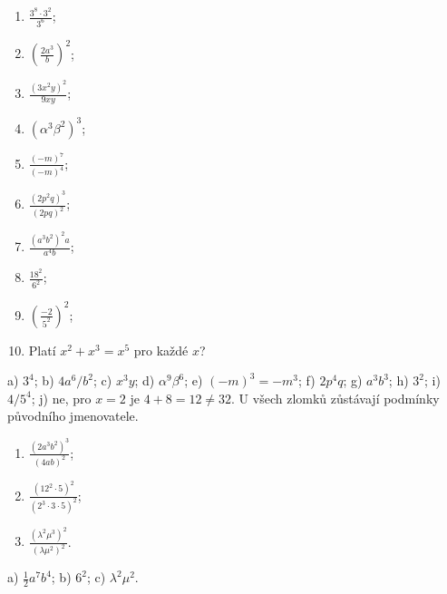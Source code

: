 \documentclass[11pt,a4paper]{article}
\begin{document}
\begin{zadaniReseniBox}[title={Domácí úkol}]
\begin{enumerate}[label=\alph*)]
\item $\frac{3^8\cdot3^2}{3^6}$;
\item $\left(\frac{2a^3}{b}\right)^2$;
\item $\frac{(3x^2y)^2}{9xy}$;
\item $(\alpha^3\beta^2)^3$;
\item $\frac{(-m)^7}{(-m)^4}$;
\item $\frac{(2p^2q)^3}{(2pq)^2}$;
\item $\frac{(a^3b^2)^2a}{a^4b}$;
\item $\frac{18^2}{6^2}$;
\item $\left(\frac{-2}{5^2}\right)^2$;
\item Platí $x^2+x^3=x^5$ pro každé $x$?
\end{enumerate}
\tcblower
 a) $3^4$; b) $4a^6/b^2$; c) $x^3y$;
 d) $\alpha^9\beta^6$; e) $(-m)^3=-m^3$;
 f) $2p^4q$; g) $a^3b^3$; h) $3^2$; i) $4/5^4$;
 j) ne, pro $x=2$ je $4+8=12\ne32$.
U všech zlomků zůstávají podmínky původního jmenovatele.
\end{zadaniReseniBox}
\begin{zadaniReseniBox}[title={Rozšíření 7},breakable=false]
\begin{enumerate}[label=\alph*)]
\item $\frac{(2a^3b^2)^3}{(4ab)^2}$;
\item $\frac{(12^2\cdot5)^2}{(2^3\cdot3\cdot5)^2}$;
\item $\frac{(\lambda^2\mu^3)^2}{(\lambda\mu^2)^2}$.
\end{enumerate}
\tcblower
 a) $\frac12a^7b^4$; b) $6^2$; c) $\lambda^2\mu^2$.
\end{zadaniReseniBox}
\end{document}
